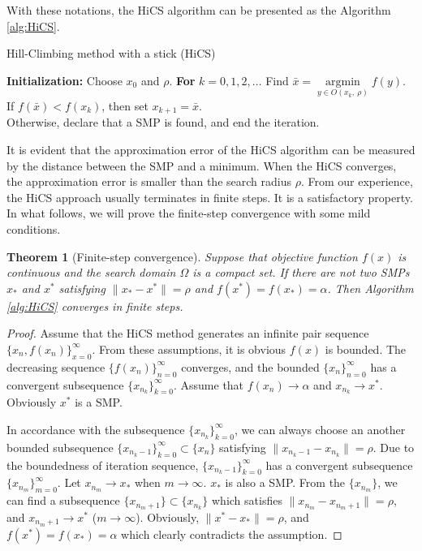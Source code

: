 \documentclass[final,1p,times]{elsarticle}
\newtheorem{theorem}{Theorem}
\DeclareMathOperator*{\argmin}{\mathrm{argmin}}
\begin{document}
With these notations, the HiCS algorithm can be presented
as the Algorithm \ref{alg:HiCS}.
\begin{algorithm}[H]
	\caption{Hill-Climbing method with a stick (HiCS)}
	\label{alg:HiCS}
\begin{algorithmic}[1]
	\STATE \textbf{Initialization:} Choose $x_0$ and $\rho$.
	\STATE \textbf{For} $k=0,1,2,\dots$
	\STATE \hspace{0.5cm} 
	Find $\bar{x}=\argmin\limits_{y\in O(x_k,~ \rho)} f(y)$.
			\\
	\STATE \hspace{0.5cm} If $f(\bar x)<f(x_k)$, then set $x_{k+1}= \bar{x}$.
		  \\
	\STATE \hspace{0.5cm} Otherwise, declare that 
		   a SMP is found, and end the iteration.
\end{algorithmic}
\end{algorithm}
It is evident that the approximation error of the HiCS algorithm
can be measured by the distance between the SMP and a minimum.
When the HiCS converges, the approximation error is smaller than the search radius
$\rho$.
From our experience, the HiCS approach usually terminates in 
finite steps. It is a satisfactory property. In what follows, we will
prove the finite-step convergence with some mild conditions.

\begin{theorem}[Finite-step convergence]
	\label{thm:fsc}
	Suppose that objective function $f(x)$ is continuous and the
	search domain $\Omega$ is a compact set.
	If there are not two SMPs $x_*$ and $x^*$ satisfying 
	$\|x_*-x^*\|=\rho$ and $f(x^*)=f(x_*)=\alpha$.
	Then Algorithm \ref{alg:HiCS} converges in finite steps.
\end{theorem}
\begin{proof}
	Assume that the HiCS method generates an infinite pair sequence
	$\{x_n, f(x_n)\}_{x=0}^{\infty}$. From these assumptions,
	it is obvious $f(x)$ is bounded. The decreasing sequence
	$\{f(x_n)\}_{n=0}^\infty$ converges, and the bounded
	$\{x_n\}_{n=0}^\infty$ has a convergent subsequence 
	$\{x_{n_k}\}_{k=0}^\infty$. Assume that $f(x_n)\rightarrow
	\alpha$ and $x_{n_k}\rightarrow x^*$. Obviously $x^*$ is a SMP.
	
	In accordance with the subsequence
	$\{x_{n_k}\}_{k=0}^\infty$, we can always choose an another
	bounded subsequence $\{x_{n_k -1}\}_{k=0}^\infty \subset
	\{x_n\}$ satisfying $\|x_{n_k - 1}-x_{n_k}\|=\rho$. 
	Due to the boundedness of iteration
	sequence, $\{x_{n_k-1}\}_{k=0}^\infty$ has a convergent
	subsequence $\{x_{n_{m}}\}_{m=0}^\infty$. Let $x_{n_m}
	\rightarrow x_*$ when $m\rightarrow \infty$. $x_*$ is also a SMP.
	From the $\{x_{n_m}\}$, we can find a subsequence
	$\{x_{n_{m}+1}\}\subset \{x_{n_k}\}$ which satisfies
	$\|x_{n_m}-x_{n_{m}+1}\|=\rho$, and $x_{n_{m}+1}\rightarrow x^*$
	($m\rightarrow \infty$).
	Obviously, $\|x^*-x_*\|=\rho$, and $f(x^*)=f(x_*)=\alpha$ 
	which clearly contradicts the assumption.
\end{proof}
\end{document}
